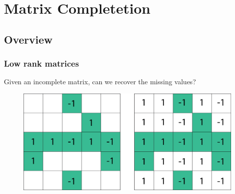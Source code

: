 \documentclass[
	11pt, %
]{beamer}
\begin{document}

\section{Matrix Completetion} %


\subsection{Overview}
%
\begin{frame}
	\frametitle{Low rank matrices}
	\begin{center}
		Given an incomplete matrix, can we recover the missing values?
	\end{center}
	\begin{figure}
		\centering 
		\includegraphics[scale=.3]{assets/mc1.jpg}
	\end{figure}
\end{frame}
\end{document}
